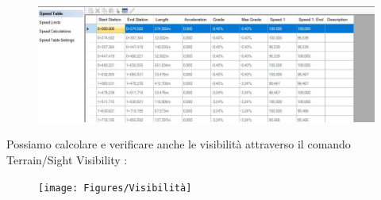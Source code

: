 \begin{figure}[H]
	\centering
	\includegraphics[width=\linewidth]{Figures/Speed Table}
    \label{fig:Speed Table}
\end{figure}

Possiamo calcolare e verificare anche le visibilità attraverso il comando Terrain/Sight Visibility :

\begin{figure}[H]
	\centering
	\texttt{[image: Figures/Visibilità]}
    \label{fig:Visibilità}
\end{figure}